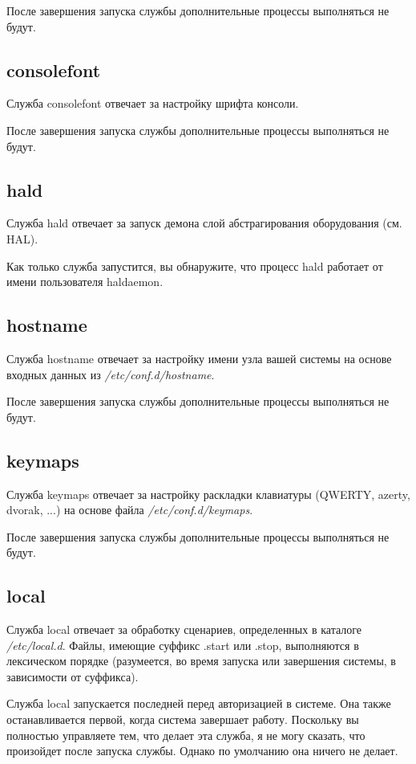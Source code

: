 \documentclass[10pt]{book}
\begin{document}
После завершения запуска службы дополнительные процессы выполняться не будут.

\subsection{consolefont}
Служба consolefont отвечает за настройку шрифта консоли.

После завершения запуска службы дополнительные процессы выполняться не будут.

\subsection{hald}
Служба hald отвечает за запуск демона слой абстрагирования оборудования (см. HAL).

Как только служба запустится, вы обнаружите, что процесс hald работает от имени пользователя haldaemon.

\subsection{hostname}
Служба hostname отвечает за настройку имени узла вашей системы на основе входных данных из \textit{/etc/conf.d/hostname}.

После завершения запуска службы дополнительные процессы выполняться не будут.

\subsection{keymaps}
Служба keymaps отвечает за настройку раскладки клавиатуры (QWERTY, azerty, dvorak, ...) на основе файла \textit{/etc/conf.d/keymaps}.

После завершения запуска службы дополнительные процессы выполняться не будут.

\subsection{local}
 Служба local отвечает за обработку сценариев, определенных в каталоге \textit{/etc/local.d}. Файлы, имеющие суффикс .start или .stop, выполняются в лексическом порядке (разумеется, во время запуска или завершения системы, в зависимости от суффикса).

Служба local запускается последней перед авторизацией в системе. Она также останавливается первой, когда система завершает работу.
Поскольку вы полностью управляете тем, что делает эта служба, я не могу сказать, что произойдет после запуска службы. Однако по умолчанию она ничего не делает.
\end{document}
